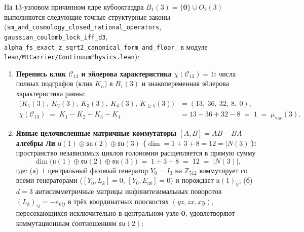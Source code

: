 \begin{theorem}
\label{thm:mono-c13-lie-alpha-fs}
На $13$-узловом причинном ядре кубооктаэдра $B_1(3) = \{\mathbf{0}\} \cup O_2(3)$ выполняются следующие точные структурные законы (\texttt{sm\_\allowbreak and\_\allowbreak cosmology\_\allowbreak closed\_\allowbreak rational\_\allowbreak operators}, \texttt{gaussian\_\allowbreak coulomb\_\allowbreak lock\_\allowbreak iff\_\allowbreak d3}, \texttt{alpha\_\allowbreak fs\_\allowbreak exact\_\allowbreak z\_\allowbreak sqrt2\_\allowbreak canonical\_\allowbreak form\_\allowbreak and\_\allowbreak floor\_} в модуле \texttt{lean/MtCarrier/ContinuumPhysics.lean}):
\begin{enumerate}[label=\textbf{(\arabic*)},leftmargin=*]
\item \textbf{Перепись клик $\mathcal{C}_{13}$ и эйлерова характеристика $\chi(\mathcal{C}_{13}) = 1$:}
  числа полных подграфов (клик $K_n$) в $B_1(3)$ и знакопеременная эйлерова характеристика равны:
  \begin{align}
    \bigl(K_1(3),\ K_2(3),\ K_3(3),\ K_4(3),\ K_{\ge 5}(3)\bigr) &= (13,\ 36,\ 32,\ 8,\ 0), \label{eq:mono-c13-cliques} \\
    \chi(\mathcal{C}_{13}) \;=\; K_1 - K_2 + K_3 - K_4 &= 13 - 36 + 32 - 8 \;=\; 1 \;=\; \mu_{\mathrm{vac}}(3). \label{eq:mono-c13-euler}
  \end{align}
\item \textbf{Явные целочисленные матричные коммутаторы $[A, B] = AB - BA$ алгебры Ли $\mathfrak{u}(1) \oplus \mathfrak{su}(2) \oplus \mathfrak{su}(3)$ ($\dim = 1 + 3 + 8 = 12 = |N(3)|$):}
  пространство независимых циклов голономии расщепляется в прямую сумму
  \begin{equation}
    \label{eq:mono-sm-gauge}
    \dim\bigl(\mathfrak{u}(1) \oplus \mathfrak{su}(2) \oplus \mathfrak{su}(3)\bigr) \;=\; 1 + 3 + 8 \;=\; 12 \;=\; |N(3)|,
  \end{equation}
  где: (а)~$1$ центральный фазовый генератор $Y_0 = I_3$ на $\mathbb{Z}_{512}$ коммутирует со всеми генераторами ($[Y_0, L_k] = 0$, $[Y_0, E_{ab}] = 0$) и порождает $\mathfrak{u}(1)_Y$; (б)~$d = 3$ антисимметричные матрицы инфинитезимальных поворотов $(L_k)_{ij} = -\varepsilon_{kij}$ в трёх координатных плоскостях $(yz, zx, xy)$, пересекающихся исключительно в центральном узле $\mathbf{0}$, удовлетворяют коммутационным соотношениям $\mathfrak{su}(2)$:

\end{enumerate}
\end{theorem}
